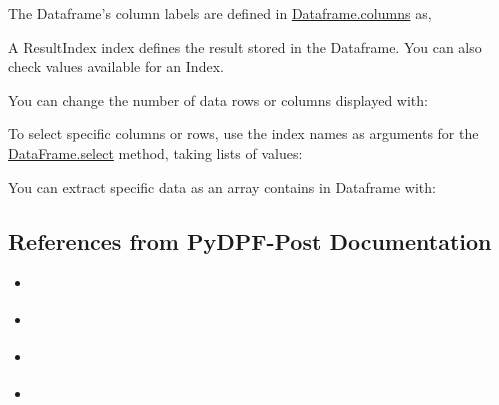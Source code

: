 \documentclass[9pt,landscape]{article}
\begin{document}
\begin{multicols}{3}

The Dataframe's column labels are defined in \underline{Dataframe.columns} as,


A ResultIndex index defines the result stored in the Dataframe. You can also check values available for an Index.


You can change the number of data rows or columns displayed with:


To select specific columns or rows, use the index names as arguments for the \underline{DataFrame.select} method, taking lists of values:


You can extract specific data as an array contains in Dataframe with:



\subsection{References from PyDPF-Post Documentation}
\begin{multicols}{2}
\begin{itemize}
    \item \href{https://post.docs.pyansys.com/version/stable/getting_started/index.html}{\color{blue}{Getting Started}}
    \item \href{https://post.docs.pyansys.com/version/stable/user_guide/index.html}{\color{blue}{User Guide}}
    \item \href{https://post.docs.pyansys.com/version/stable/examples/index.html}{\color{blue}{Examples}}
    \item \href{https://post.docs.pyansys.com/version/stable/api/index.html}{\color{blue}{API Reference}}
\end{itemize}
\end{multicols}
\end{multicols}
\end{document}

